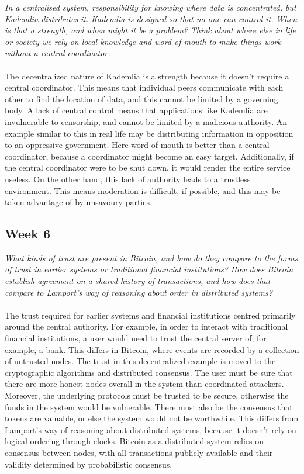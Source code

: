 \documentclass{article}
\theoremstyle{definition}
\begin{document}
\textit{In a centralised system, responsibility for knowing where data is concentrated, but Kademlia distributes it.}
\textit{Kademlia is designed so that no one can control it. When is that a strength, and when might it be a problem?}
\textit{Think about where else in life or society we rely on local knowledge and word-of-mouth to make things work without a central coordinator.}
\\
\\
\noindent
The decentralized nature of Kademlia is a strength because it doesn't require a central coordinator.
This means that individual peers communicate with each other to find the location of data, 
and this cannot be limited by a governing body.
A lack of central control means that applications like Kademlia are invulnerable to censorship,
and cannot be limited by a malicious authority.
An example similar to this in real life may be distributing information in opposition to an oppressive government.
Here word of mouth is better than a central coordinator, because a coordinator might become an easy target.
Additionally, if the central coordinator were to be shut down, it would render the entire service useless. 
On the other hand, this lack of authority leads to a trustless environment.
This means moderation is difficult, if possible, and this may be taken advantage of by unsavoury parties.

\subsection{Week 6}

\textit{What kinds of trust are present in Bitcoin, and how do they compare to the forms of trust in earlier systems or traditional financial institutions?}
\textit{How does Bitcoin establish agreement on a shared history of transactions, and how does that compare to Lamport's way of reasoning about order in distributed systems?}
\\
\\
\noindent
The trust required for earlier systems and financial institutions centred primarily around the central authority.
For example, in order to interact with traditional financial institutions, a user would need to trust the central server of, for example, a bank.
This differs in Bitcoin, where events are recorded by a collection of untrusted nodes.
The trust in this decentralized example is moved to the cryptographic algorithms and distributed consensus.
The user must be sure that there are more honest nodes overall in the system than coordinated attackers.
Moreover, the underlying protocols must be trusted to be secure, otherwise the funds in the system would be vulnerable.
There must also be the consensus that tokens are valuable, or else the system would not be worthwhile.
This differs from Lamport's way of reasoning about distributed systems, because it doesn't rely on logical ordering through clocks.
Bitcoin as a distributed system relies on consensus between nodes, with all transactions publicly available and their validity determined by probabilistic consensus.
\end{document}
